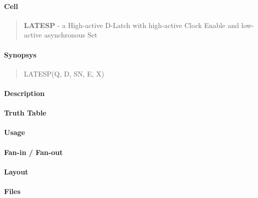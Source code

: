 \label{LATESP}
\paragraph{Cell}
\begin{quote}
    \textbf{LATESP} - a High-active D-Latch with high-active Clock Enable and low-active asynchronous Set
\end{quote}

\paragraph{Synopsys}
\begin{quote}
    LATESP(Q, D, SN, E, X)
\end{quote}

\paragraph{Description}

%

\paragraph{Truth Table}
%

\paragraph{Usage}

\paragraph{Fan-in / Fan-out}

\paragraph{Layout}

\paragraph{Files}
